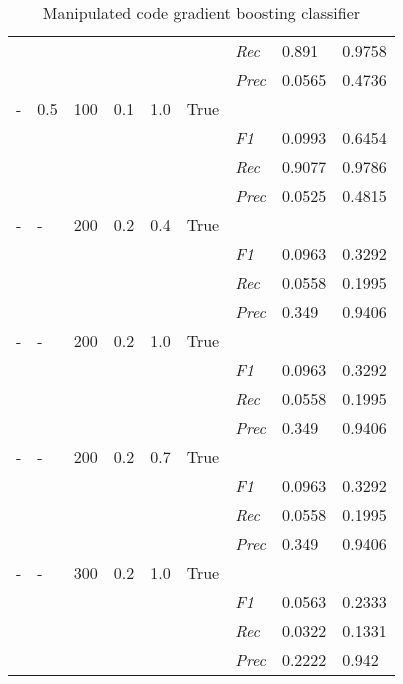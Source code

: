 \begin{table}[]
\begin{tabularx}{\textwidth}{XXXXXX|X|X|X}
& & & & & & \textit{Rec} &  0.891 & 0.9758    \\
& & & & & & \textit{Prec} & 0.0565 & 0.4736  \\ \midrule
- & 0.5 & 100 & 0.1 & 1.0 &True & & &  \\
& & & & & & \textit{F1} & 0.0993 & 0.6454        \\
& & & & & & \textit{Rec} &  0.9077 & 0.9786    \\
& & & & & & \textit{Prec} & 0.0525 & 0.4815  \\ \midrule
- & - & 200 & 0.2 & 0.4 &True & & &  \\
& & & & & & \textit{F1} & 0.0963 & 0.3292        \\
& & & & & & \textit{Rec} &  0.0558 & 0.1995    \\
& & & & & & \textit{Prec} & 0.349 & 0.9406  \\ \midrule
- & - & 200 & 0.2 & 1.0 &True & & &  \\
& & & & & & \textit{F1} & 0.0963 & 0.3292        \\
& & & & & & \textit{Rec} &  0.0558 & 0.1995    \\
& & & & & & \textit{Prec} & 0.349 & 0.9406  \\ \midrule
- & - & 200 & 0.2 & 0.7 &True & & &  \\
& & & & & & \textit{F1} & 0.0963 & 0.3292        \\
& & & & & & \textit{Rec} &  0.0558 & 0.1995    \\
& & & & & & \textit{Prec} & 0.349 & 0.9406  \\ \midrule
- & - & 300 & 0.2 & 1.0 &True & & &  \\
& & & & & & \textit{F1} & 0.0563 & 0.2333        \\
& & & & & & \textit{Rec} &  0.0322 & 0.1331    \\
& & & & & & \textit{Prec} & 0.2222 & 0.942  \\ \midrule
\end{tabularx}
\caption{Manipulated code gradient boosting classifier}
\label{tab:rq3_gradient_boosting_classifier}
\end{table}

